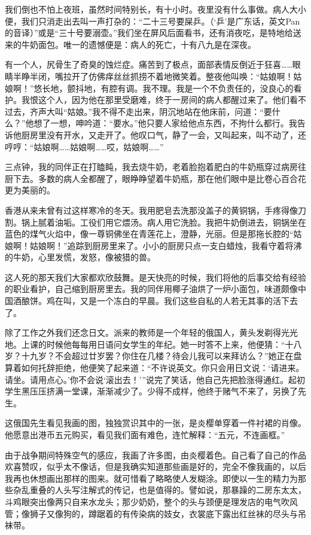 \par 我们倒也不怕上夜班，虽然时间特别长，有十小时。夜里没有什么事做。病人大小便，我们只消走出去叫一声打杂的：“二十三号要屎乒。（‘乒’是广东话，英文Pan的音译）”或是“三十号要溺壶。”我们坐在屏风后面看书，还有消夜吃，是特地给送来的牛奶面包。唯一的遗憾便是：病人的死亡，十有八九是在深夜。
\par 有一个人，尻骨生了奇臭的蚀烂症。痛苦到了极点，面部表情反倒近于狂喜……眼睛半睁半闭，嘴拉开了仿佛痒丝丝抓捞不着地微笑着。整夜他叫唤：“姑娘啊！姑娘啊！”悠长地，颤抖地，有腔有调。我不理。我是一个不负责任的，没良心的看护。我恨这个人，因为他在那里受磨难，终于一房间的病人都醒过来了。他们看不过去，齐声大叫“姑娘。”我不得不走出来，阴沉地站在他床前，问道：“要什么？”他想了一想，呻吟道：“要水。”他只要人家给他点东西，不拘什么都行。我告诉他厨房里没有开水，又走开了。他叹口气，静了一会，又叫起来，叫不动了，还哼哼：“姑娘啊……姑娘啊……哎，姑娘啊……”
\par 三点钟，我的同伴正在打瞌盹，我去烧牛奶，老着脸抱着肥白的牛奶瓶穿过病房往厨下去。多数的病人全都醒了，眼睁睁望着牛奶瓶，那在他们眼中是比卷心百合花更为美丽的。
\par 香港从来未曾有过这样寒冷的冬天。我用肥皂去洗那没盖子的黄铜锅，手疼得像刀割。锅上腻着油垢。工役们用它煨汤。病人用它洗脸。我把牛奶倒进去，铜锅坐在蓝色的煤气火焰中，像一尊铜佛坐在青莲花上，澄静，光丽。但是那拖长腔的“姑娘啊！姑娘啊！”追踪到厨房里来了。小小的厨房只点一支白蜡烛，我看守着将沸的牛奶，心里发慌，发怒，像被猎的兽。
\par 这人死的那天我们大家都欢欣鼓舞。是天快亮的时候，我们将他的后事交给有经验的职业看护，自己缩到厨房里去。我的同伴用椰子油烘了一炉小面包，味道颇像中国酒酿饼。鸡在叫，又是一个冻白的早晨。我们这些自私的人若无其事的活下去了。
\par 除了工作之外我们还念日文。派来的教师是一个年轻的俄国人，黄头发剃得光光地。上课的时候他每每用日语问女学生的年纪。她一时答不上来，他便猜：“十八岁？十九岁？不会超过廿岁罢？你住在几楼？待会儿我可以来拜访么？”她正在盘算着如何托辞拒绝，他便笑了起来道：“不许说英文。你只会用日文说：‘请进来。请坐。请用点心。’你不会说‘滚出去！’”说完了笑话，他自己先把脸涨得通红。起初学生黑压压挤满一堂课，渐渐减少了。少得不成样，他终于赌气不来了，另换了先生。
\par 这俄国先生看见我画的图，独独赏识其中的一张，是炎樱单穿着一件衬裙的肖像。他愿意出港币五元购买，看见我们面有难色，连忙解释：“五元，不连画框。”
\par 由于战争期间特殊空气的感应，我画了许多图，由炎樱着色。自己看了自己的作品欢喜赞叹，似乎太不像话，但是我确实知道那些画是好的，完全不像我画的，以后我再也休想画出那样的图来。就可惜看了略略使人发糊涂。即使以一生的精力为那些杂乱重叠的人头写注解式的传记，也是值得的。譬如说，那暴躁的二房东太太，斗鸡眼突出像两只自来水龙头；那少奶奶，整个的头与颈便是理发店的电气吹风管；像狮子又像狗的，蹲踞着的有传染病的妓女，衣裳底下露出红丝袜的尽头与吊袜带。
